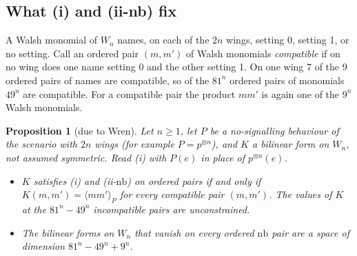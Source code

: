 \documentclass[11pt,a4paper]{article}
\newtheorem{proposition}[theorem]{Proposition}
\theoremstyle{definition}
\theoremstyle{remark}
\newcommand{\nb}{\mathrm{nb}}
\begin{document}
\subsection{What (i) and (ii-nb) fix}

A Walsh monomial of $W_n$ names, on each of the $2n$ wings, setting 0, setting 1, or no setting. Call an ordered pair $(m, m')$ of Walsh monomials \emph{compatible} if on no wing does one name setting 0 and the other setting 1. On one wing 7 of the 9 ordered pairs of names are compatible, so of the $81^n$ ordered pairs of monomials $49^n$ are compatible. For a compatible pair the product $m m'$ is again one of the $9^n$ Walsh monomials.

\begin{proposition}[due to Wren]\label{p:dim}
Let $n \ge 1$, let $P$ be a no-signalling behaviour of the scenario with $2n$ wings (for example $P = p^{\otimes n}$), and $K$ a bilinear form on $W_n$, not assumed symmetric. Read (i) with $P(e)$ in place of $p^{\otimes n}(e)$.
\begin{itemize}
  \item[(a)] $K$ satisfies (i) and (ii-$\nb$) on ordered pairs if and only if $K(m, m') = \langle m m' \rangle_P$ for every compatible pair $(m, m')$. The values of $K$ at the $81^n - 49^n$ incompatible pairs are unconstrained.
  \item[(b)] The bilinear forms on $W_n$ that vanish on every ordered $\nb$ pair are a space of dimension $81^n - 49^n + 9^n$.
\end{itemize}
\end{proposition}
\end{document}
